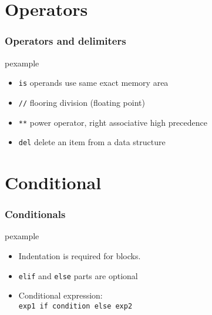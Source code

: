 \documentclass[trans,compress,xcolor=table]{beamer}
\begin{document}
\section{Operators}
\begin{frame}
\frametitle{Operators and delimiters}
\begin{beamercolorbox}{pexample}
\codeoperators
\end{beamercolorbox}
\begin{itemize}
\item \lstinline!is! operands use same exact memory area
\item \lstinline!//! flooring division (floating point)
\item \lstinline!**! power operator, right associative high precedence
\item \lstinline!del! delete an item from a data structure
\end{itemize}

\end{frame}


\section{Conditional}

\begin{frame}
\frametitle{Conditionals}
\begin{beamercolorbox}{pexample}
\codecondition
\end{beamercolorbox}
\begin{itemize}
\item Indentation is required for blocks.
\item \lstinline!elif! and \lstinline!else! parts are optional
\item Conditional expression:\\
\lstinline!exp1 if condition else exp2!
\end{itemize}
\end{frame}
\end{document}
